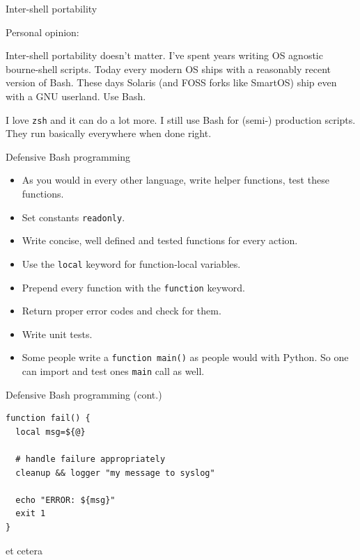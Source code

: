 \begin{frame}{Inter-shell portability}

\begin{block}{Personal opinion:}

Inter-shell portability doesn't matter. I've spent years writing OS
agnostic bourne-shell scripts. Today every modern OS ships with a
reasonably recent version of Bash. These days Solaris (and FOSS forks
like SmartOS) ship even with a GNU userland. Use Bash.

I love \texttt{zsh} and it can do a lot more. I still use Bash for
(semi-) production scripts. They run basically everywhere when done
right.

\end{block}

\end{frame}

\begin{frame}{Defensive Bash programming}

\begin{itemize}
\itemsep1pt\parskip0pt
\item
  As you would in every other language, write helper functions, test
  these functions.
\item
  Set constants \texttt{readonly}.
\item
  Write concise, well defined and tested functions for every action.
\item
  Use the \texttt{local} keyword for function-local variables.
\item
  Prepend every function with the \texttt{function} keyword.
\item
  Return proper error codes and check for them.
\item
  Write unit tests.
\item
  Some people write a \texttt{function main()} as people would with
  Python. So one can import and test ones \texttt{main} call as well.
\end{itemize}

\end{frame}

\begin{frame}[fragile]{Defensive Bash programming (cont.)}

\begin{verbatim}
function fail() {
  local msg=${@}

  # handle failure appropriately
  cleanup && logger "my message to syslog"

  echo "ERROR: ${msg}"
  exit 1
}
\end{verbatim}

et cetera

\end{frame}

